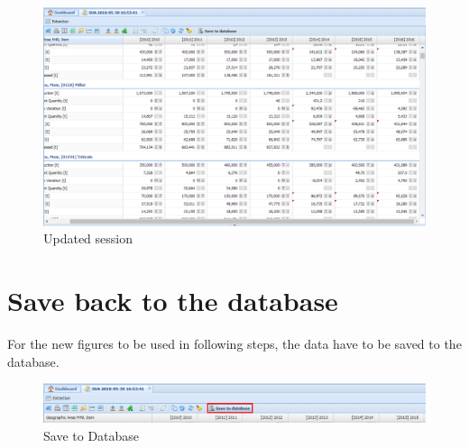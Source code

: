 \documentclass[]{article}
\begin{document}
\begin{figure}[H]

{\centering \includegraphics[width=1\linewidth]{images/pullData/19_updatedFigures} 

}

\caption{\label{fig:f19}Updated session}\label{fig:f19}
\end{figure}

\section{Save back to the database}\label{save-back-to-the-database}

For the new figures to be used in following steps, the data have to be
saved to the database.

\begin{figure}[H]

{\centering \includegraphics[width=1\linewidth]{images/pullData/20_saveToDatabase} 

}

\caption{\label{fig:f20}Save to Database}\label{fig:f20}
\end{figure}
\end{document}

